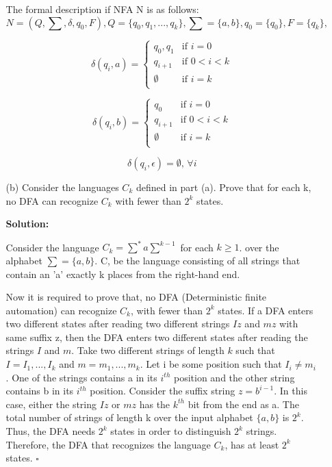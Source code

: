 \documentclass[9pt,tikz,border=2mm]{article}
\begin{document}
\begin{enumerate}
\begin{enumerate}
              The formal description if NFA N is as follows:\newline
                \[
                    N=(Q,\sum,\delta,q_0,F),
                    Q = \{q_0,q_1,...,q_k\},
                    \sum=\{a,b\},
                    q_0=\{q_0\},
                    F=\{q_k\},
                \]
                

                \[
                    \delta(q_i,a)=
                    \begin{cases}
                        {q_0,q_1} & \text{if } i=0 \\
                        {q_{i+1}} & \text{if } 0<i<k \\
                        \emptyset & \text{if } i=k \\
                    \end{cases}
                \]


                \[
                    \delta(q_i,b)=
                    \begin{cases}
                        {q_0} & \text{if } i=0 \\
                        {q_{i+1}} & \text{if } 0<i<k \\
                        \emptyset & \text{if } i=k \\
                    \end{cases}
                \]

                \[\delta(q_i,\epsilon) = \emptyset \text{, } \forall i\]

                \item[(b)]Consider the languages $C_k$ defined in part (a). Prove that for each k, no DFA can recognize $C_k$ with fewer than $2^k$ states.
                
                \textbf{Solution:}

              
                Consider the language $C_k =\sum^*a\sum^{k-1}$ for each $k\geq1$. over the alphabet $\sum=\{a,b\}$. C, be the language consisting of all strings that contain an 'a' exactly k places from the right-hand end.

                Now it is required to prove that, no DFA (Deterministic finite automation) can recognize $C_k$, with fewer than $2^k$ states.
                If a DFA enters two different states after reading two different strings $Iz$ and $mz$ with same suffix z, then the DFA enters two different states after reading the strings $I$ and $m$. Take two different strings of length $k$ such that $I=I_1,...,I_k$ and $m=m_1,...,m_k$. Let i be some position such that $I_i\neq m_i$. One of the strings contains a in its $i^{th}$ position and the other string contains b in its $i^{th}$ position.
                Consider the suffix string $z = b^{i-1}$. In this case, either the string $Iz$ or $mz$ has the $k^{th}$ bit from the end as a. The total number of strings of length k over the input alphabet $\{a,b\}$ is $2^k$. Thus, the DFA needs $2^k$ states in order to distinguish $2^k$ strings.
                Therefore, the DFA that recognizes the language $C_k$, has at least $2^k$ states.
                $\square$


\end{enumerate}
\end{enumerate}
\end{document}
